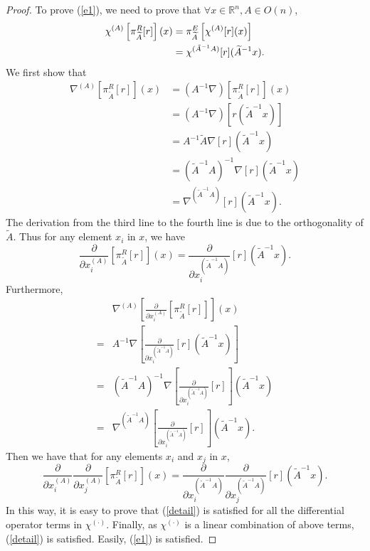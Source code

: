 \documentclass{article}
\newtheorem{proof}{Proof}
\begin{document}
\begin{proof}
	To prove (\ref{e1}), we need to prove that $\forall x\in \mathbb{R}^n,A\in O(n)$,
	\begin{align}
	\chi^{(A)}\left[\pi_{\widetilde A}^R[r]\right](x) &= \pi_{\widetilde A}^E\left[\chi^{(A)}[r](x)\right]\notag\\
	& = \chi^{(\tilde A^{-1}A)}[r](\widetilde A^{-1}x).\label{detail}
	\end{align}
	We first show that
	\small{
		\begin{align*}
		\nabla^{(A)} \left[\pi^{R}_{\widetilde A}[r]\right](x)
		& = (A^{-1}\nabla) \left[\pi^{R}_{\widetilde A}[r]\right](x)\\
		&=(A^{-1}\nabla) \left[r( \widetilde A^{-1}x)\right]\\
		&=A^{-1}\widetilde A\nabla [r] (\widetilde{A}^{-1}x)\\
		&=(\widetilde{A}^{-1}A)^{-1}\nabla [r] (\widetilde{A}^{-1}x)\\
		&=\nabla^{(\widetilde{A}^{-1}A)}[r](\widetilde{A}^{-1}x).
		\end{align*}}
	The derivation from the third line to the fourth line is due to the orthogonality of $\widetilde{A}$. Thus for any element $x_i$ in $x$, we have
	\begin{equation*}
	\frac{\partial}{\partial x_i^{(A)}} \left[\pi^{R}_{\widetilde A}[r]\right](x)= \frac{\partial}{\partial x_i^{(\tilde A^{-1}A)}}[r] (\tilde A^{-1}x).
	\end{equation*}
	Furthermore,
	\begin{align*}
	&\nabla^{(A)}\left[\frac{\partial}{\partial x_i^{(A)}} \left[\pi^{R}_{\widetilde A}[r]\right]\right](x)\\
	=&A^{-1}\nabla\left[\frac{\partial}{\partial x_i^{(\widetilde{A}^{-1}A)}} [r](\widetilde{A}^{-1}x)\right]\\
	=&(\widetilde{A}^{-1}A)^{-1}\nabla\left[\frac{\partial}{\partial x_i^{(\widetilde{A}^{-1}A)}} [r]\right](\widetilde{A}^{-1}x)\\
	=&\nabla^{(\widetilde{A}^{-1}A)}\left[\frac{\partial}{\partial x_i^{(\widetilde{A}^{-1}A)}} [r]\right](\widetilde{A}^{-1}x).
	\end{align*}
	Then we have that for any elements $x_i$ and $x_j$ in $x$,
	\begin{equation*}
	\frac{\partial}{\partial x_i^{(A)}}\frac{\partial}{\partial x_j^{(A)}} \left[\pi^{R}_{\widetilde A}[r]\right](x)= \frac{\partial}{\partial x_i^{(\tilde A^{-1}A)}}\frac{\partial}{\partial x_j^{(\tilde A^{-1}A)}}[r] (\tilde A^{-1}x).
	\end{equation*}
	In this way, it is easy to prove that (\ref{detail}) is satisfied for all the differential operator terms in $\chi^{(\cdot)}$. Finally, as $\chi^{(\cdot)}$ is a linear combination of above terms, (\ref{detail}) is satisfied. Easily, (\ref{e1}) is satisfied.
	

\end{proof}
\end{document}
